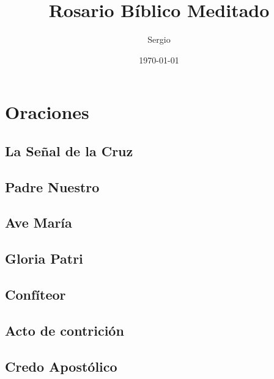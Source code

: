 \documentclass[11pt,a4paper]{book}
\title{Rosario Bíblico Meditado}
\author{Sergio}
\date{\today}
\begin{document}
    \begin{titlepage}
    \maketitle        
    \end{titlepage}

    \chapter{Oraciones}

    \section{La Señal de la Cruz}\label{sec:senal-cruz}
    

    \section{Padre Nuestro}\label{sec:paternoster}
    

    \section{Ave María}\label{sec:avemaria}
    

    \section{Gloria Patri}\label{sec_gloria}
    

    \section{Confíteor}\label{sec:confiteor}
    

    \section{Acto de contrición}\label{sec:contricion}
    

    \section{Credo Apostólico}\label{sec:credo}
    
\end{document}
